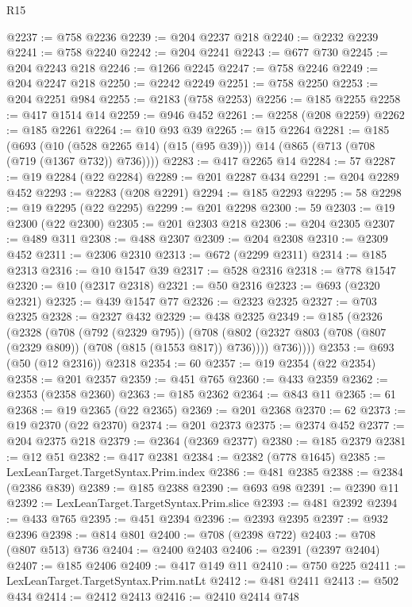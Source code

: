 \begin{lexlean}{R15}
\begin{coremodule}
{{{{{@2237 := @758 @2236
@2239 := @204 @2237 @218
@2240 := @2232 @2239
@2241 := @758 @2240
@2242 := @204 @2241
@2243 := @677 @730
@2245 := @204 @2243 @218
@2246 := @1266 @2245
@2247 := @758 @2246
@2249 := @204 @2247 @218
@2250 := @2242 @2249
@2251 := @758 @2250
@2253 := @204 @2251 @984
@2255 := @2183 (@758 @2253)
@2256 := @185 @2255
@2258 := @417 @1514 @14
@2259 := @946 @452
@2261 := @2258 (@208 @2259)
@2262 := @185 @2261
@2264 := @10 @93 @39
@2265 := @15 @2264
@2281 := @185
    (@693 (@10 (@528 @2265 @14) (@15 (@95 @39))) @14 (@865 (@713 (@708 (@719 (@1367 @732)) @736))))
@2283 := @417 @2265 @14
@2284 := 57
@2287 := @19 @2284 (@22 @2284)
@2289 := @201 @2287 @434
@2291 := @204 @2289 @452
@2293 := @2283 (@208 @2291)
@2294 := @185 @2293
@2295 := 58
@2298 := @19 @2295 (@22 @2295)
@2299 := @201 @2298
@2300 := 59
@2303 := @19 @2300 (@22 @2300)
@2305 := @201 @2303 @218
@2306 := @204 @2305
@2307 := @489 @311
@2308 := @488 @2307
@2309 := @204 @2308
@2310 := @2309 @452
@2311 := @2306 @2310
@2313 := @672 (@2299 @2311)
@2314 := @185 @2313
@2316 := @10 @1547 @39
@2317 := @528 @2316
@2318 := @778 @1547
@2320 := @10 (@2317 @2318)
@2321 := @50 @2316
@2323 := @693 (@2320 @2321)
@2325 := @439 @1547 @77
@2326 := @2323 @2325
@2327 := @703 @2325
@2328 := @2327 @432
@2329 := @438 @2325
@2349 := @185
    (@2326
      (@2328
        (@708
          (@792 (@2329 @795))
          (@708
            (@802 (@2327 @803 (@708 (@807 (@2329 @809)) (@708 (@815 (@1553 @817)) @736))))
            @736))))
@2353 := @693 (@50 (@12 @2316)) @2318
@2354 := 60
@2357 := @19 @2354 (@22 @2354)
@2358 := @201 @2357
@2359 := @451 @765
@2360 := @433 @2359
@2362 := @2353 (@2358 @2360)
@2363 := @185 @2362
@2364 := @843 @11
@2365 := 61
@2368 := @19 @2365 (@22 @2365)
@2369 := @201 @2368
@2370 := 62
@2373 := @19 @2370 (@22 @2370)
@2374 := @201 @2373
@2375 := @2374 @452
@2377 := @204 @2375 @218
@2379 := @2364 (@2369 @2377)
@2380 := @185 @2379
@2381 := @12 @51
@2382 := @417 @2381
@2384 := @2382 (@778 @1645)
@2385 := LexLeanTarget.TargetSyntax.Prim.index
@2386 := @481 @2385
@2388 := @2384 (@2386 @839)
@2389 := @185 @2388
@2390 := @693 @98
@2391 := @2390 @11
@2392 := LexLeanTarget.TargetSyntax.Prim.slice
@2393 := @481 @2392
@2394 := @433 @765
@2395 := @451 @2394
@2396 := @2393 @2395
@2397 := @932 @2396
@2398 := @814 @801
@2400 := @708 (@2398 @722)
@2403 := @708 (@807 @513) @736
@2404 := @2400 @2403
@2406 := @2391 (@2397 @2404)
@2407 := @185 @2406
@2409 := @417 @149 @11
@2410 := @750 @225
@2411 := LexLeanTarget.TargetSyntax.Prim.natLt
@2412 := @481 @2411
@2413 := @502 @434
@2414 := @2412 @2413
@2416 := @2410 @2414 @748
}}}}}
\end{coremodule}
\end{lexlean}
